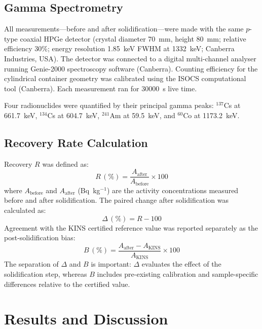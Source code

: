 \documentclass[preprint,12pt]{elsarticle}
\begin{document}
\subsection{Gamma Spectrometry}

All measurements---before and after solidification---were made with
the same $p$-type coaxial HPGe detector (crystal diameter 70~mm,
height 80~mm; relative efficiency 30\%; energy resolution 1.85~keV
FWHM at 1332~keV; Canberra Industries, USA).
The detector was connected to a digital multi-channel analyser running
Genie-2000 spectroscopy software (Canberra).
Counting efficiency for the cylindrical container geometry was
calibrated using the ISOCS computational tool (Canberra).
Each measurement ran for 30000~s live time.

Four radionuclides were quantified by their principal gamma peaks:
$^{137}$Cs at 661.7~keV, $^{134}$Cs at 604.7~keV,
$^{241}$Am at 59.5~keV, and $^{60}$Co at 1173.2~keV.

\subsection{Recovery Rate Calculation}

Recovery $R$ was defined as:
\begin{equation}
  R\,(\%) = \frac{A_{\text{after}}}{A_{\text{before}}} \times 100
  \label{eq:recovery}
\end{equation}
where $A_{\text{before}}$ and $A_{\text{after}}$ (Bq~kg$^{-1}$) are
the activity concentrations measured before and after solidification.
The paired change after solidification was calculated as:
\begin{equation}
  \Delta\,(\%) = R - 100
  \label{eq:change}
\end{equation}
Agreement with the KINS certified reference value was reported separately
as the post-solidification bias:
\begin{equation}
  B\,(\%) = \frac{A_{\text{after}} - A_{\text{KINS}}}{A_{\text{KINS}}} \times 100
  \label{eq:bias}
\end{equation}
The separation of $\Delta$ and $B$ is important: $\Delta$ evaluates the
effect of the solidification step, whereas $B$ includes pre-existing
calibration and sample-specific differences relative to the certified value.


\section{Results and Discussion}
\end{document}
